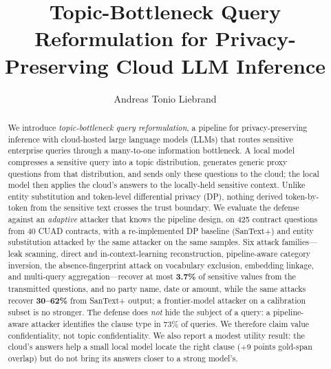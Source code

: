 \documentclass[sigconf,balance=false]{acmart}
\begin{document}
\title[Topic-Bottleneck Query Reformulation]{Topic-Bottleneck Query Reformulation for Privacy-Preserving Cloud LLM Inference}

\author{Andreas Tonio Liebrand}

\begin{abstract}
We introduce \emph{topic-bottleneck query reformulation}, a pipeline for privacy-preserving inference with cloud-hosted large language models (LLMs) that routes sensitive enterprise queries through a many-to-one information bottleneck.
A local model compresses a sensitive query into a topic distribution, generates generic proxy questions from that distribution, and sends only these questions to the cloud; the local model then applies the cloud's answers to the locally-held sensitive context.
Unlike entity substitution and token-level differential privacy (DP), nothing derived token-by-token from the sensitive text crosses the trust boundary.
We evaluate the defense against an \emph{adaptive} attacker that knows the pipeline design, on 425 contract questions from 40 CUAD contracts, with a re-implemented DP baseline (SanText+) and entity substitution attacked by the same attacker on the same samples.
Six attack families---leak scanning, direct and in-context-learning reconstruction, pipeline-aware category inversion, the absence-fingerprint attack on vocabulary exclusion, embedding linkage, and multi-query aggregation---recover at most \textbf{3.7\%} of sensitive values from the transmitted questions, and no party name, date or amount, while the same attacks recover \textbf{30--62\%} from SanText+ output; a frontier-model attacker on a calibration subset is no stronger.
The defense does \emph{not} hide the subject of a query: a pipeline-aware attacker identifies the clause type in 73\% of queries.
We therefore claim value confidentiality, not topic confidentiality.
We also report a modest utility result: the cloud's answers help a small local model locate the right clause (+9 points gold-span overlap) but do not bring its answers closer to a strong model's.
\end{abstract}


\maketitle
\end{document}
